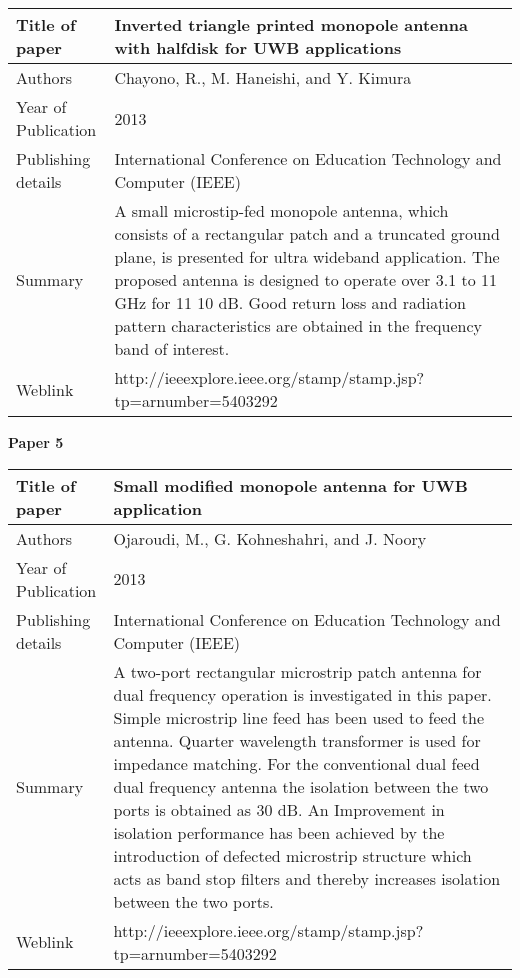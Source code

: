 \documentclass[12pt]{article}
\begin{document}
		   	\begin{table}[h]
		   		\centering
		   		\begin{tabular}{ |l|p{11cm}| }
		   			\hline
		   			Title of paper &  Inverted triangle printed monopole antenna with halfdisk for UWB applications \\
		   			\hline
		   			Authors & Chayono, R., M. Haneishi, and Y. Kimura \\
		   			\hline
		   			Year of Publication & 2013 \\
		   			\hline
		   			Publishing details & International Conference on Education Technology and Computer (IEEE) \\ \hline
		   			Summary & A small microstip-fed monopole antenna, which consists of a rectangular patch and a truncated ground plane, is presented for ultra wideband application. The proposed antenna is designed to operate over 3.1 to 11 GHz for 11 10 dB. Good return loss and radiation pattern characteristics are obtained in the frequency band of interest.\\
		   			\hline
		   			Weblink & http://ieeexplore.ieee.org/stamp/stamp.jsp?tp=arnumber=5403292 \\
		   			\hline
		   		\end{tabular}

		   	\end{table}

  	  \cleardoublepage
  	  
		\begin{flushleft}
			\textbf{Paper 5}
		\end{flushleft}


	    	\begin{table}[h]
	    		\centering
	    		\begin{tabular}{ |l|p{11cm}| }
	    			\hline
	    			Title of paper & Small modified monopole antenna for UWB application \\
	    			\hline
	    			Authors & Ojaroudi, M., G. Kohneshahri, and J. Noory \\
	    			\hline
	    			Year of Publication & 2013 \\
	    			\hline
	    			Publishing details & International Conference on Education Technology and Computer (IEEE) \\ \hline
	    			Summary & A two-port rectangular microstrip patch antenna for dual frequency operation is investigated in this paper. Simple microstrip line feed has been used to feed the antenna. Quarter wavelength transformer is used for impedance matching. For the conventional dual feed dual frequency antenna the isolation between the two ports is obtained as 30 dB. An Improvement in isolation performance has been achieved by the introduction of defected microstrip structure which acts as band stop filters and thereby increases isolation between the two ports.\\
	    			\hline
	    			Weblink & http://ieeexplore.ieee.org/stamp/stamp.jsp?tp=arnumber=5403292 \\
	    			\hline
	    		\end{tabular}

	    	\end{table}
	    	
\end{document}
